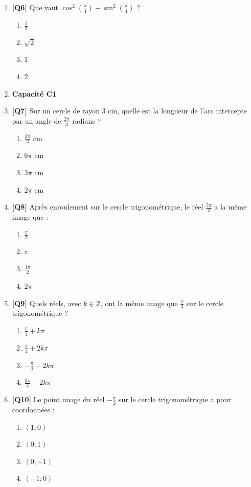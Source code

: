 \begin{enumerate}
\item \textbf{[Q6]} Que vaut $\cos^2\left(\frac{\pi}{4}\right) + \sin^2\left(\frac{\pi}{4}\right)$ ?
  \begin{enumerate}[label=\Alph*.]
    \item $\frac{1}{2}$
    \item $\sqrt{2}$
    \item $1$
    \item $2$
  \end{enumerate}

\item[] \textbf{Capacité C1}

\item \textbf{[Q7]} Sur un cercle de rayon $3$ cm, quelle est la longueur de l'arc intercepte par un angle de $\frac{2\pi}{3}$ radians ?
  \begin{enumerate}[label=\Alph*.]
    \item $\frac{2\pi}{3}$ cm
    \item $6\pi$ cm
    \item $3\pi$ cm
    \item $2\pi$ cm
  \end{enumerate}

\item \textbf{[Q8]} Après enroulement sur le cercle trigonométrique, le réel $\frac{5\pi}{2}$ a la même image que :
  \begin{enumerate}[label=\Alph*.]
    \item $\frac{\pi}{2}$
    \item $\pi$
    \item $\frac{3\pi}{2}$
    \item $2\pi$
  \end{enumerate}

\item \textbf{[Q9]} Quels réels, avec $k \in \mathbb{Z}$, ont la même image que $\frac{\pi}{4}$ sur le cercle trigonométrique ?
  \begin{enumerate}[label=\Alph*.]
    \item $\frac{\pi}{4}+k\pi$
    \item $\frac{\pi}{4}+2k\pi$
    \item $-\frac{\pi}{4}+2k\pi$
    \item $\frac{3\pi}{4}+2k\pi$
  \end{enumerate}

\item \textbf{[Q10]} Le point image du réel $-\frac{\pi}{2}$ sur le cercle trigonométrique a pour coordonnées :
  \begin{enumerate}[label=\Alph*.]
    \item $(1;0)$
    \item $(0;1)$
    \item $(0;-1)$
    \item $(-1;0)$
  \end{enumerate}


\end{enumerate}

